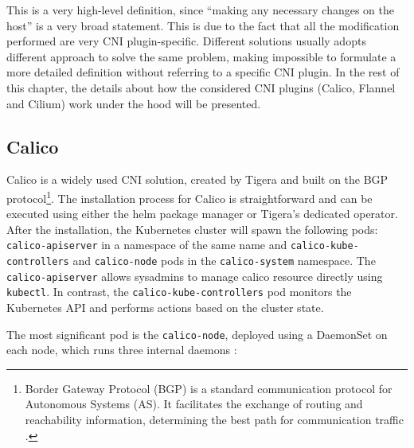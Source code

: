 This is a very high-level definition, since ``making any necessary changes on
the host'' is a very broad statement. This is due to the fact that all the
modification performed are very CNI plugin-specific. Different solutions usually
adopts different approach to solve the same problem, making impossible to
formulate a more detailed definition without referring to a specific CNI plugin.
In the rest of this chapter, the details about how the considered CNI plugins
(Calico, Flannel and Cilium) work under the hood will be presented.


\subsection{Calico}\label{subsec:calico}

Calico is a widely used CNI solution, created by Tigera and built on the BGP
protocol\footnote{Border Gateway Protocol (BGP) is a standard communication
  protocol for Autonomous Systems (AS). It facilitates the exchange of routing
  and reachability information, determining the best path for communication
  traffic \cite{BGPnistdef}.}.
The installation process for Calico is straightforward and can be executed using
either the helm package manager or Tigera's dedicated operator.
After the installation, the Kubernetes cluster will spawn the following pods:
\texttt{calico-apiserver} in a namespace of the same name and
\texttt{calico-kube-controllers} and \texttt{calico-node} pods in the
\texttt{calico-system} namespace.
The \texttt{calico-apiserver} allows sysadmins to manage calico resource
directly using \texttt{kubectl}.
In contrast, the \texttt{calico-kube-controllers} pod monitors the Kubernetes
API and performs actions based on the cluster state.

The most significant pod is the \texttt{calico-node}, deployed using a DaemonSet
on each node, which runs three internal daemons \cite{calicodoc}:

